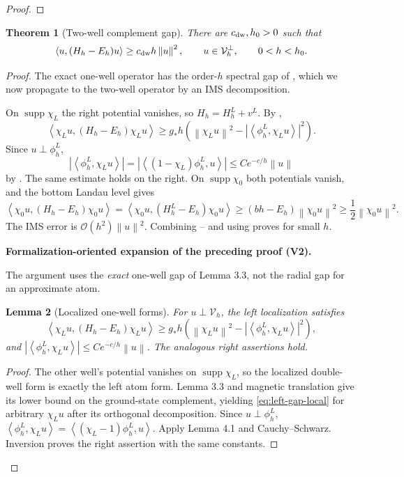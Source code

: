 \documentclass[11pt]{article}
\newtheorem{theorem}{Theorem}[section]
\newtheorem{lemma}[theorem]{Lemma}
\newcommand{\formalisationparentid}{X}
\newenvironment{formalisationaddition}[1]{\par\medskip\begingroup\color{blue}\def\formalisationparentid{#1}\setcounter{formalizationsublemma}{0}\let\lemma\formalizationsublemma\let\endlemma\endformalizationsublemma
  \def\Eo{\mathcal E_h^\circ}\def\EE{\mathcal E_h}\def\phio{\phi_h^\circ}\def\phih{\phi_h}\def\Ho{H_h^{\rm atom}(v^\circ)}\def\Ha{H_h^{\rm atom}}\def\HL{H_h^{L}}\def\Dh{D_h}\def\Log{\operatorname{Log}}\def\ellh{\ell_h}\def\Gp{G_{p,h}}\def\Ast{A_{*,h}}\def\ahat{\widehat{\mathfrak a}_h}\def\ah{\mathfrak a_h}\def\rh{\widehat\rho_h}\def\deltah{\widehat\delta_h}\def\oldref##1{\textup{(##1)}}\def\interface##1{\par\noindent\textit{Analytical interface used here.} ##1\par}\def\finish{\par\noindent\textit{Conclusion of the formalization-oriented expansion.} }\par\noindent\textbf{Formalization-oriented expansion of the preceding proof (V2).}\par\smallskip
}{\par\endgroup\medskip
}
\newcommand{\cO}{\mathcal O}
\newcommand{\norm}[1]{\left\|#1\right\|}
\newcommand{\ip}[2]{\left\langle #1,#2\right\rangle}
\newcommand{\supp}{\operatorname{supp}}
\begin{document}
\begin{proof}
\end{proof}

\begin{theorem}[Two-well complement gap]\label{thm:two-well-gap}
There are $c_{\rm dw},h_0>0$ such that
\begin{equation}\label{eq:Vperp-gap}
 \ip{u}{(H_h-E_h)u}
 \ge c_{\rm dw}h\norm{u}^2,
 \qquad
 u\in\mathcal V_h^\perp,
 \qquad 0<h<h_0.
\end{equation}

\end{theorem}

\begin{proof}
The exact one-well operator has the order-$h$ spectral gap of , which we now propagate to the two-well operator by an IMS decomposition.

On $\supp\chi_L$ the right potential vanishes, so
$H_h=H_h^L+v^L$.  By ,
\begin{equation}\label{eq:left-gap-local}
 \ip{\chi_Lu}{(H_h-E_h)\chi_Lu}
 \ge g_*h\left(
 \norm{\chi_Lu}^2-|\ip{\phi_h^L}{\chi_Lu}|^2
 \right).
\end{equation}
Since $u\perp\phi_h^L$,
\[
 |\ip{\phi_h^L}{\chi_Lu}|
 =|\ip{(1-\chi_L)\phi_h^L}{u}|
 \le Ce^{-c/h}\norm{u}
\]
by .  The same estimate holds on the right.
On $\supp\chi_0$ both potentials vanish, and the bottom Landau level gives
\begin{equation}\label{eq:exterior-gap}
 \ip{\chi_0u}{(H_h-E_h)\chi_0u}
 =\ip{\chi_0u}{(H_h^L-E_h)\chi_0u}
 \ge(bh-E_h)\norm{\chi_0u}^2
 \ge\frac12\norm{\chi_0u}^2.
\end{equation}
The IMS error is $\cO(h^2)\norm{u}^2$.  Combining
-- and using
 proves  for small $h$.

\begin{formalisationaddition}{T4.2}
The argument uses the \emph{exact} one-well gap of Lemma 3.3, not the radial gap for an approximate atom.

\begin{lemma}[Localized one-well forms]\label{sublemma:T4-2-localized}
For $u\perp\mathcal V_h$, the left localization satisfies
\begin{equation*}
 \ip{\chi_Lu}{(H_h-E_h)\chi_Lu}
 \ge g_*h\left(\norm{\chi_Lu}^2-
             |\ip{\phi_h^L}{\chi_Lu}|^2\right),
\end{equation*}
and $|\ip{\phi_h^L}{\chi_Lu}|\le Ce^{-c/h}\norm u$. The analogous right assertions hold.
\end{lemma}
\begin{proof}
The other well's potential vanishes on $\supp\chi_L$, so the localized double-well form is exactly the left atom form. Lemma 3.3 and magnetic translation give its lower bound on the ground-state complement, yielding \eqref{eq:left-gap-local} for arbitrary $\chi_Lu$ after its orthogonal decomposition. Since $u\perp\phi_h^L$,
$\ip{\phi_h^L}{\chi_Lu}=\ip{(\chi_L-1)\phi_h^L}{u}$. Apply Lemma 4.1 and Cauchy--Schwarz. Inversion proves the right assertion with the same constants.
\end{proof}


\end{formalisationaddition}
\end{proof}
\end{document}
